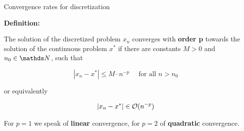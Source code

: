 \documentclass[11pt,compress,t,notes=noshow, xcolor=table]{beamer}
\begin{document}
\begin{vbframe}{Convergence rates for discretization}

\textbf{Definition: }

The solution of the discretized problem $x_n$ converges with \textbf{order p} towards the solution of the continuous problem $x^*$ if there are constants $M > 0$ and $n_0 \in \N$, such that

$$
|x_n - x^*| \le M\cdot n^{-p} \quad \text{ for all } n > n_0
$$

or equivalently

$$
|x_n - x^*| \in \mathcal{O}{(n^{-p})}
$$

For $p = 1$ we speak of \textbf{linear} convergence, for $p = 2$ of \textbf{quadratic} convergence.

\end{vbframe}


% 
% 
% 



%
%
%
%
%
%
%
%
\end{document}

